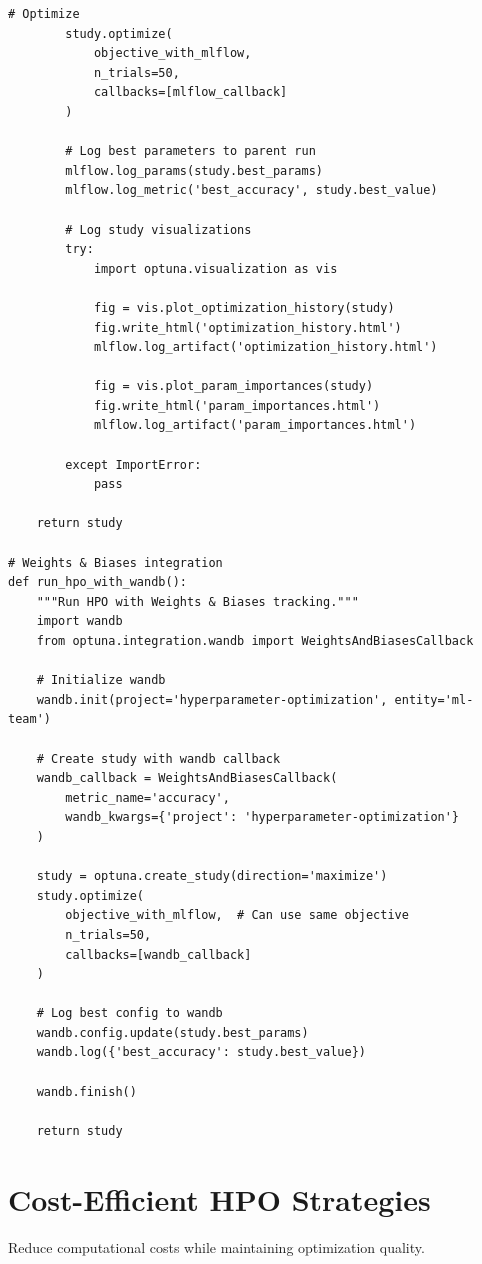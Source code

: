 \begin{lstlisting}[style=python, caption=HPO with MLflow tracking]
        # Optimize
        study.optimize(
            objective_with_mlflow,
            n_trials=50,
            callbacks=[mlflow_callback]
        )

        # Log best parameters to parent run
        mlflow.log_params(study.best_params)
        mlflow.log_metric('best_accuracy', study.best_value)

        # Log study visualizations
        try:
            import optuna.visualization as vis

            fig = vis.plot_optimization_history(study)
            fig.write_html('optimization_history.html')
            mlflow.log_artifact('optimization_history.html')

            fig = vis.plot_param_importances(study)
            fig.write_html('param_importances.html')
            mlflow.log_artifact('param_importances.html')

        except ImportError:
            pass

    return study

# Weights & Biases integration
def run_hpo_with_wandb():
    """Run HPO with Weights & Biases tracking."""
    import wandb
    from optuna.integration.wandb import WeightsAndBiasesCallback

    # Initialize wandb
    wandb.init(project='hyperparameter-optimization', entity='ml-team')

    # Create study with wandb callback
    wandb_callback = WeightsAndBiasesCallback(
        metric_name='accuracy',
        wandb_kwargs={'project': 'hyperparameter-optimization'}
    )

    study = optuna.create_study(direction='maximize')
    study.optimize(
        objective_with_mlflow,  # Can use same objective
        n_trials=50,
        callbacks=[wandb_callback]
    )

    # Log best config to wandb
    wandb.config.update(study.best_params)
    wandb.log({'best_accuracy': study.best_value})

    wandb.finish()

    return study
\end{lstlisting}

\section{Cost-Efficient HPO Strategies}

Reduce computational costs while maintaining optimization quality.

